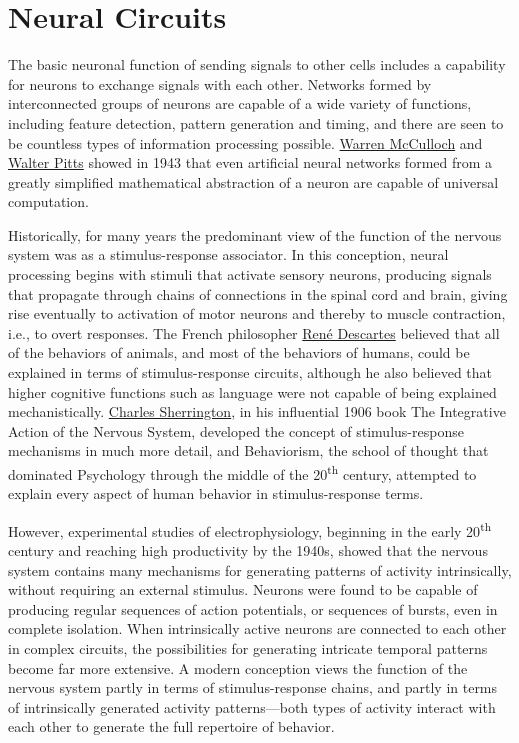 \hypertarget{neural-circuits}{%
\section{Neural Circuits}\label{neural-circuits}}

The basic neuronal function of sending signals to other cells includes a capability for neurons to exchange signals with each other. Networks formed by interconnected groups of neurons are capable of a wide variety of functions, including feature detection, pattern generation and timing, and there are seen to be countless types of information processing possible. \href{https://en.wikipedia.org/wiki/Warren_Sturgis_McCulloch}{Warren McCulloch} and \href{https://en.wikipedia.org/wiki/Walter_Pitts}{Walter Pitts} showed in 1943 that even artificial neural networks formed from a greatly simplified mathematical abstraction of a neuron are capable of universal computation.

Historically, for many years the predominant view of the function of the nervous system was as a stimulus-response associator. In this conception, neural processing begins with stimuli that activate sensory neurons, producing signals that propagate through chains of connections in the spinal cord and brain, giving rise eventually to activation of motor neurons and thereby to muscle contraction, i.e., to overt responses. The French philosopher \href{https://en.wikipedia.org/wiki/René_Descartes}{René Descartes} believed that all of the behaviors of animals, and most of the behaviors of humans, could be explained in terms of stimulus-response circuits, although he also believed that higher cognitive functions such as language were not capable of being explained mechanistically. \href{https://en.wikipedia.org/wiki/Charles_Scott_Sherrington}{Charles Sherrington}, in his influential 1906 book The Integrative Action of the Nervous System, developed the concept of stimulus-response mechanisms in much more detail, and Behaviorism, the school of thought that dominated Psychology through the middle of the 20\textsuperscript{th} century, attempted to explain every aspect of human behavior in stimulus-response terms.

However, experimental studies of electrophysiology, beginning in the early 20\textsuperscript{th} century and reaching high productivity by the 1940s, showed that the nervous system contains many mechanisms for generating patterns of activity intrinsically, without requiring an external stimulus. Neurons were found to be capable of producing regular sequences of action potentials, or sequences of bursts, even in complete isolation. When intrinsically active neurons are connected to each other in complex circuits, the possibilities for generating intricate temporal patterns become far more extensive. A modern conception views the function of the nervous system partly in terms of stimulus-response chains, and partly in terms of intrinsically generated activity patterns---both types of activity interact with each other to generate the full repertoire of behavior.

